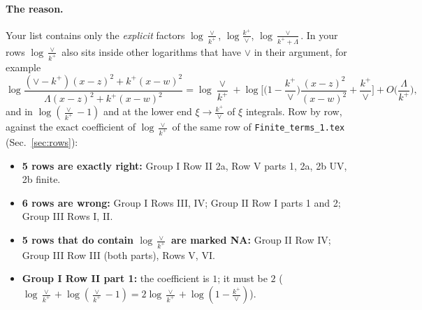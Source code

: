 \documentclass[10pt]{article}
\numberwithin{equation}{section}
\begin{document}
\paragraph{The reason.} Your list contains only the \emph{explicit} factors $\log\frac{\vee}{k^+}$, $\log\frac{k^+}{\vee}$, $\log\frac{\vee}{k^++\Lambda}$. In your rows $\log\frac{\vee}{k^+}$ also sits inside other logarithms that have $\vee$ in their argument, for example
\begin{equation*}
\log\frac{(\vee-k^+)(x-z)^2+k^+(x-w)^2}{\Lambda(x-z)^2+k^+(x-w)^2}=\log\frac{\vee}{k^+}+\log\Big[\Big(1-\frac{k^+}{\vee}\Big)\frac{(x-z)^2}{(x-w)^2}+\frac{k^+}{\vee}\Big]+O\Big(\frac{\Lambda}{k^+}\Big),
\end{equation*}
and in $\log(\frac{\vee}{k^+}-1)$ and at the lower end $\xi\to\frac{k^+}{\vee}$ of $\xi$ integrals. Row by row, against the exact coefficient of $\log\frac{\vee}{k^+}$ of the same row of \texttt{Finite\_terms\_1.tex} (Sec.~\ref{sec:rows}):
\begin{itemize}
\item \textbf{5 rows are exactly right:} Group I Row II 2a, Row V parts 1, 2a, 2b UV, 2b finite.
\item \textbf{6 rows are wrong:} Group I Rows III, IV; Group II Row I parts 1 and 2; Group III Rows I, II.
\item \textbf{5 rows that do contain $\log\frac{\vee}{k^+}$ are marked NA:} Group II Row IV; Group III Row III (both parts), Rows V, VI.
\item \textbf{Group I Row II part 1:} the coefficient is $1$; it must be $2$ ($\log\frac{\vee}{k^+}+\log(\frac{\vee}{k^+}-1)=2\log\frac{\vee}{k^+}+\log(1-\frac{k^+}{\vee})$).
\end{itemize}
\end{document}
